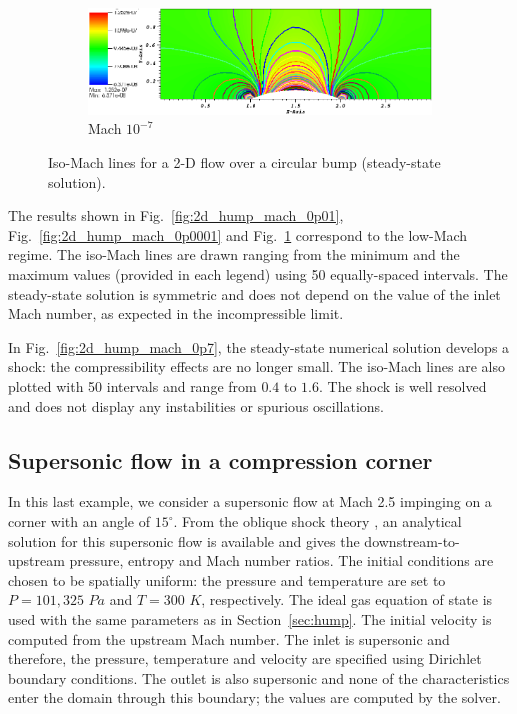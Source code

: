 \documentclass[review,10pt]{elsarticle}
\newcommand{\fig}[1]{Fig.~\ref{#1}}                      %
\newcommand{\sct}[1]{Section~\ref{#1}}                   %
\begin{document}
\begin{figure}[H]
        \begin{subfigure}[b]{\textwidth}
                \centering
                \includegraphics[width=\textwidth]{figures/Hump2D_mach_1em7.png}
                \caption{Mach $10^{-7}$}
                \label{fig:2d_hump_mach_0p0000001}
        \end{subfigure}
        \caption{Iso-Mach lines for a 2-D flow over a circular bump (steady-state solution).}
				\label{fig:2d_hump}
\end{figure}
%
The results shown in \fig{fig:2d_hump_mach_0p01}, \fig{fig:2d_hump_mach_0p0001} and \fig{fig:2d_hump_mach_0p0000001} 
correspond to the low-Mach regime. The iso-Mach lines are drawn ranging from the minimum and the maximum values 
(provided in each legend) using 50 equally-spaced intervals. The steady-state solution is symmetric and does not 
depend on the value of the inlet Mach number, as expected in the incompressible limit. 

In \fig{fig:2d_hump_mach_0p7}, the steady-state numerical solution develops a shock: the compressibility effects 
are no longer small. The iso-Mach lines are also plotted with 50 intervals and range from $0.4$ to $1.6$. 
The shock is well resolved and does not display any instabilities or spurious oscillations. 

\subsection{Supersonic flow in a compression corner} \label{sec:corner}

In this last example, we consider a supersonic flow at Mach 2.5 impinging on a corner with an angle of $15^\circ$. 
From the oblique shock theory \cite{CompressionCorner}, an analytical solution for this supersonic flow is available 
and gives the downstream-to-upstream pressure, entropy and Mach number ratios. 
The initial conditions are chosen to be spatially uniform: the pressure and temperature are set to $P=101,325$ $Pa$ 
and $T=300$ $K$, respectively.  The ideal gas equation of state is used with the same parameters as in \sct{sec:hump}. 
The initial velocity is computed from the upstream Mach number. The inlet is supersonic and therefore, the pressure, 
temperature and velocity are specified using Dirichlet boundary conditions. The outlet is also supersonic and none 
of the characteristics enter the domain through this boundary; the values are computed by the solver.
\end{document}
